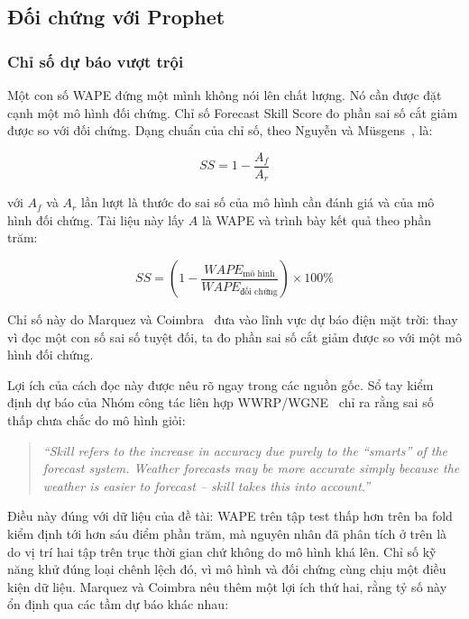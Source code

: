 \FloatBarrier
\subsection{Đối chứng với Prophet}

\subsubsection{Chỉ số dự báo vượt trội}

Một con số WAPE đứng một mình không nói lên chất lượng. Nó cần được đặt cạnh một mô hình đối
chứng. Chỉ số Forecast Skill Score đo phần sai số cắt giảm được so với đối chứng. Dạng chuẩn của
chỉ số, theo Nguyễn và Müsgens~\cite{nguyen2026meta}, là:

\begin{equation}
\label{eq:ss_tong_quat}
SS = 1 - \frac{A_f}{A_r}
\end{equation}

với $A_f$ và $A_r$ lần lượt là thước đo sai số của mô hình cần đánh giá và của mô hình đối
chứng. Tài liệu này lấy $A$ là WAPE và trình bày kết quả theo phần trăm:

\begin{equation}
\label{eq:ss_wape}
SS = \left(1 - \frac{WAPE_{\text{mô hình}}}{WAPE_{\text{đối chứng}}}\right) \times 100\%
\end{equation}

Chỉ số này do Marquez và Coimbra~\cite{marquez2013skill} đưa vào lĩnh vực dự báo điện mặt trời:
thay vì đọc một con số sai số tuyệt đối, ta đo phần sai số cắt giảm được so với một mô hình đối
chứng.

Lợi ích của cách đọc này được nêu rõ ngay trong các nguồn gốc. Sổ tay kiểm định dự báo của Nhóm công
tác liên hợp WWRP/WGNE~\cite{wwrp2009verif} chỉ ra rằng sai số thấp chưa chắc do mô hình giỏi:

\begin{quote}\small
\textit{``Skill refers to the increase in accuracy due purely to the ``smarts'' of the forecast
system. Weather forecasts may be more accurate simply because the weather is easier to forecast
-- skill takes this into account.''}
\end{quote}

Điều này đúng với dữ liệu của đề tài: WAPE trên tập test thấp hơn trên ba fold kiểm định tới hơn
sáu điểm phần trăm, mà nguyên nhân đã phân tích ở trên là do vị trí hai tập trên trục thời gian
chứ không do mô hình khá lên. Chỉ số kỹ năng khử đúng loại chênh lệch đó, vì mô hình và đối
chứng cùng chịu một điều kiện dữ liệu. Marquez và Coimbra nêu thêm một lợi ích thứ hai, rằng tỷ
số này ổn định qua các tầm dự báo khác nhau:

